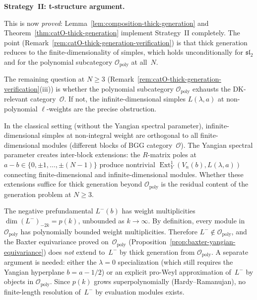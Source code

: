 \medskip

\noindent\textbf{Strategy~II\@: t-structure argument.}

This is now \emph{proved}: Lemma~\ref{lem:composition-thick-generation}
and Theorem~\ref{thm:catO-thick-generation} implement Strategy~II
completely. The point
(Remark~\ref{rem:catO-thick-generation-verification}) is that
thick generation reduces to the finite-dimensionality of simples,
which holds unconditionally for $\mathfrak{sl}_2$ and for
the polynomial subcategory $\mathcal{O}_{\mathrm{poly}}$ at all~$N$.

\begin{remark}
\label{rem:infinite-dim-simples}
The remaining question at $N \ge 3$
(Remark~\ref{rem:catO-thick-generation-verification}(iii)) is
whether the polynomial subcategory $\mathcal{O}_{\mathrm{poly}}$
exhausts the DK-relevant category~$\mathcal{O}$. If not, the
infinite-dimensional simples $L(\lambda, a)$ at non-polynomial
$\ell$-weights are the precise obstruction.

In the classical setting (without the Yangian spectral parameter),
infinite-dimensional simples at non-integral weight are orthogonal
to all finite-dimensional modules (different blocks of BGG
category~$\mathcal{O}$). The Yangian spectral parameter creates
inter-block extensions: the $R$-matrix poles at
$a - b \in \{0, \pm 1, \ldots, \pm (N-1)\}$ produce nontrivial
$\operatorname{Ext}^1_Y(V_n(b), L(\lambda, a))$ connecting
finite-dimensional and infinite-dimensional modules. Whether these
extensions suffice for thick generation beyond
$\mathcal{O}_{\mathrm{poly}}$ is the residual content of the
generation problem at $N \ge 3$.
\end{remark}

\begin{remark}
\label{rem:opoly-not-dense}
The negative prefundamental $L^-(b)$ has weight multiplicities
$\dim(L^-)_{-2k} = p(k)$, unbounded as $k \to \infty$.
By definition, every module in~$\mathcal{O}_{\mathrm{poly}}$ has
polynomially bounded weight multiplicities. Therefore
$L^- \notin \mathcal{O}_{\mathrm{poly}}$, and the Baxter
equivariance proved on~$\mathcal{O}_{\mathrm{poly}}$
(Proposition~\ref{prop:baxter-yangian-equivariance}) does
\emph{not} extend to~$L^-$ by thick generation from
$\mathcal{O}_{\mathrm{poly}}$. A separate argument
is needed: either the $\lambda = 0$ specialization
(which still requires the Yangian hyperplane
$b = a - 1/2$) or an
explicit pro-Weyl approximation of~$L^-$ by objects in
$\mathcal{O}_{\mathrm{poly}}$. Since $p(k)$ grows
superpolynomially (Hardy--Ramanujan), no finite-length
resolution of~$L^-$ by evaluation modules exists.
\end{remark}


